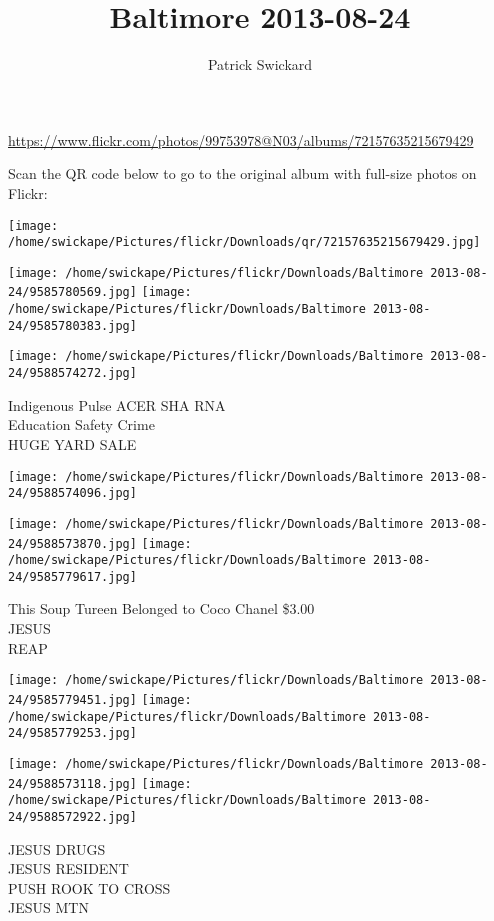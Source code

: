 \documentclass[10pt,letterpaper]{article}
\title{Baltimore 2013-08-24}
\author{Patrick Swickard}
\date{}
\begin{document}
\maketitle

\url{https://www.flickr.com/photos/99753978@N03/albums/72157635215679429}

Scan the QR code below to go to the original album with full-size photos on Flickr:

\texttt{[image: /home/swickape/Pictures/flickr/Downloads/qr/72157635215679429.jpg]}
\pagebreak

\texttt{[image: /home/swickape/Pictures/flickr/Downloads/Baltimore 2013-08-24/9585780569.jpg]}
\texttt{[image: /home/swickape/Pictures/flickr/Downloads/Baltimore 2013-08-24/9585780383.jpg]}

\texttt{[image: /home/swickape/Pictures/flickr/Downloads/Baltimore 2013-08-24/9588574272.jpg]}

Indigenous Pulse ACER SHA RNA\\
Education Safety Crime\\
HUGE YARD SALE
\pagebreak

\texttt{[image: /home/swickape/Pictures/flickr/Downloads/Baltimore 2013-08-24/9588574096.jpg]}

\vspace{0.25in}
\texttt{[image: /home/swickape/Pictures/flickr/Downloads/Baltimore 2013-08-24/9588573870.jpg]}
\texttt{[image: /home/swickape/Pictures/flickr/Downloads/Baltimore 2013-08-24/9585779617.jpg]}

This Soup Tureen Belonged to Coco Chanel \$3.00\\
JESUS\\
REAP
\pagebreak

\texttt{[image: /home/swickape/Pictures/flickr/Downloads/Baltimore 2013-08-24/9585779451.jpg]}
\texttt{[image: /home/swickape/Pictures/flickr/Downloads/Baltimore 2013-08-24/9585779253.jpg]}

\texttt{[image: /home/swickape/Pictures/flickr/Downloads/Baltimore 2013-08-24/9588573118.jpg]}
\texttt{[image: /home/swickape/Pictures/flickr/Downloads/Baltimore 2013-08-24/9588572922.jpg]}

JESUS DRUGS\\
JESUS RESIDENT\\
PUSH ROOK TO CROSS\\
JESUS MTN
\pagebreak
\end{document}
